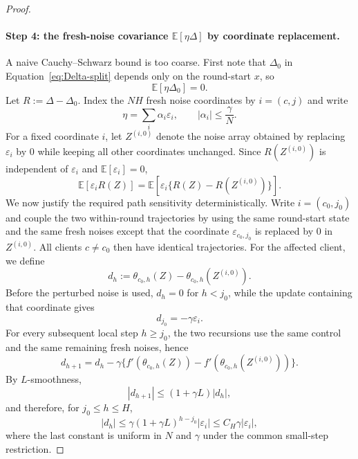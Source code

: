 \documentclass[11pt]{article}
\theoremstyle{definition}
\newcommand{\E}{\mathbb{E}}
\newcommand{\eps}{\varepsilon}
\begin{document}
\begin{proof}
\paragraph{Step 4: the fresh-noise covariance $\E[\eta\Delta]$ by coordinate replacement.}
A naive Cauchy--Schwarz bound is too coarse. First note that $\Delta_0$ in Equation~\eqref{eq:Delta-split} depends only on the round-start $x$, so
\begin{equation}
\label{eq:etaDelta0}
  \E[\eta\Delta_0]=0.
\end{equation}
Let $R:=\Delta-\Delta_0$. Index the $NH$ fresh noise coordinates by $i=(c,j)$ and write
\[
  \eta=\sum_i\alpha_i\eps_i,
  \qquad |\alpha_i|\le \frac{\gamma}{N}.
\]
For a fixed coordinate $i$, let $Z^{(i,0)}$ denote the noise array obtained by replacing $\eps_i$ by $0$ while keeping all other coordinates unchanged. Since $R(Z^{(i,0)})$ is independent of $\eps_i$ and $\E[\eps_i]=0$,
\begin{equation}
\label{eq:coord-replace}
  \E[\eps_iR(Z)]
  =\E\left[\eps_i\{R(Z)-R(Z^{(i,0)})\}\right].
\end{equation}
We now justify the required path sensitivity deterministically. Write $i=(c_0,j_0)$ and couple the two within-round trajectories by using the same round-start state and the same fresh noises except that the coordinate $\eps_{c_0,j_0}$ is replaced by $0$ in $Z^{(i,0)}$. All clients $c\neq c_0$ then have identical trajectories. For the affected client, we define
\[
  d_h:=\theta_{c_0,h}(Z)-\theta_{c_0,h}(Z^{(i,0)}).
\]
Before the perturbed noise is used, $d_h=0$ for $h<j_0$, while the update containing that coordinate gives
\[
  d_{j_0}=-\gamma\eps_i.
\]
For every subsequent local step $h\ge j_0$, the two recursions use the same control and the same remaining fresh noises, hence
\[
  d_{h+1}
  =d_h-\gamma\{f'(\theta_{c_0,h}(Z))-f'(\theta_{c_0,h}(Z^{(i,0)}))\}.
\]
By $L$-smoothness,
\[
  |d_{h+1}|\le (1+\gamma L)|d_h|,
\]
and therefore, for $j_0\le h\le H$,
\[
  |d_h|
  \le \gamma(1+\gamma L)^{h-j_0}|\eps_i|
  \le C_H\gamma|\eps_i|,
\]
where the last constant is uniform in $N$ and $\gamma$ under the common small-step restriction.


\end{proof}
\end{document}
